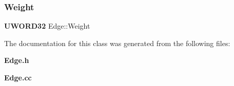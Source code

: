 \mbox{\label{classEdge_a9aa7a0c6a76f8b360f96ab564603b9c5}} 
\subsubsection{Weight}
{\footnotesize\ttfamily \textbf{ U\+W\+O\+R\+D32} Edge\+::\+Weight\hspace{0.3cm}{\ttfamily [private]}}



The documentation for this class was generated from the following files\+:\begin{DoxyCompactItemize}
\item 
\textbf{ Edge.\+h}\item 
\textbf{ Edge.\+cc}\end{DoxyCompactItemize}
